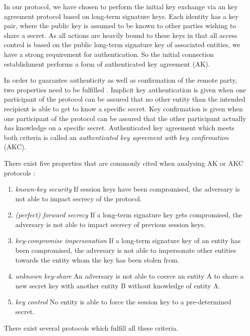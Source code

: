 In our protocol, we have chosen to perform the initial key exchange via an key agreement protocol based on long-term signature keys.
Each identity has a key pair, where the public key is assumed to be known to other parties wishing to share a secret.
As all actions are heavily bound to these keys in that all access control is based on the public long-term signature key of associated entities, we have a strong requirement for authentication.
So the initial connection establishment performs a form of authenticated key agreement (AK).

In order to guarantee authenticity as well as confirmation of the remote party, two properties need to be fulfilled \cite{law2003efficient}.
Implicit key authentication is given when one participant of the protocol can be assured that no other entity than the intended recipient is able to get to know a specific secret.
Key confirmation is given when one participant of the protocol can be assured that the other participant actually \emph{has} knowledge on a specific secret.
Authenticated key agreement which meets both criteria is called an \emph{authenticated key agreement with key confirmation} (AKC).

There exist five properties that are commonly cited when analysing AK or AKC protocols \cite{menezes1996handbook,blake1997key,law2003efficient}:
\begin{enumerate}
    \item \emph{known-key security}
        If session keys have been compromised, the adversary is not able to impact secrecy of the protocol.
    \item \emph{(perfect) forward secrecy}
        If a long-term signature key gets compromised, the adversary is not able to impact secrecy of previous session keys.
    \item \emph{key-compromise impersonation}
        If a long-term signature key of an entity has been compromised, the adversary is not able to impersonate other entities towards the entity whom the key has been stolen from.
    \item \emph{unknown key-share}
        An adversary is not able to coerce an entity A to share a new secret key with another entity B without knowledge of entity A.
    \item \emph{key control}
        No entity is able to force the session key to a pre-determined secret.
\end{enumerate}
There exist several protocols which fulfill all these criteria.

